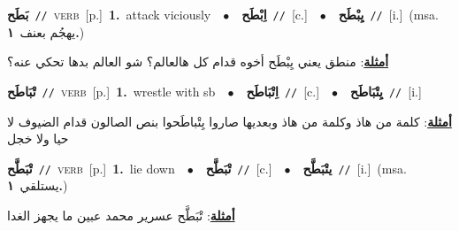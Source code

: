 \documentclass[10pt,a4paper,twoside]{article} %
\begin{document}
\begin{multicols}{2}
{\setlength\topsep{0pt}\textbf{\foreignlanguage{arabic}{بَطَح}}\ {\color{gray}\texttt{//}\color{black}}\ \textsc{verb}\ [p.]\ \textbf{1.}~attack viciously\ \ $\bullet$\ \ \setlength\topsep{0pt}\textbf{\foreignlanguage{arabic}{اِبْطَح}}\ {\color{gray}\texttt{//}\color{black}}\ [c.]\ \ $\bullet$\ \ \setlength\topsep{0pt}\textbf{\foreignlanguage{arabic}{يِبْطَح}}\ {\color{gray}\texttt{//}\color{black}}\ [i.]\ \color{gray}(msa. \foreignlanguage{arabic}{يهجُم بعنف}~\foreignlanguage{arabic}{\textbf{١.}})\color{black}\  \begin{flushright}\color{gray}\foreignlanguage{arabic}{\textbf{\underline{\foreignlanguage{arabic}{أمثلة}}}: منطق يعني يِبْطَح أخوه قدام كل هالعالم؟ شو العالم بدها تحكي عنه؟}\end{flushright}\color{black}} \vspace{2mm}

{\setlength\topsep{0pt}\textbf{\foreignlanguage{arabic}{تْبَاطَح}}\ {\color{gray}\texttt{//}\color{black}}\ \textsc{verb}\ [p.]\ \textbf{1.}~wrestle with sb\ \ $\bullet$\ \ \setlength\topsep{0pt}\textbf{\foreignlanguage{arabic}{اِتْبَاطَح}}\ {\color{gray}\texttt{//}\color{black}}\ [c.]\ \ $\bullet$\ \ \setlength\topsep{0pt}\textbf{\foreignlanguage{arabic}{يِتْبَاطَح}}\ {\color{gray}\texttt{//}\color{black}}\ [i.]\  \begin{flushright}\color{gray}\foreignlanguage{arabic}{\textbf{\underline{\foreignlanguage{arabic}{أمثلة}}}: كلمة من هاذ وكلمة من هاذ وبعديها صاروا يِتْباطَحوا بنص الصالون قدام الضيوف لا حيا ولا خجل}\end{flushright}\color{black}} \vspace{2mm}

{\setlength\topsep{0pt}\textbf{\foreignlanguage{arabic}{تْبَطَّح}}\ {\color{gray}\texttt{//}\color{black}}\ \textsc{verb}\ [p.]\ \textbf{1.}~lie down\ \ $\bullet$\ \ \setlength\topsep{0pt}\textbf{\foreignlanguage{arabic}{تْبَطَّح}}\ {\color{gray}\texttt{//}\color{black}}\ [c.]\ \ $\bullet$\ \ \setlength\topsep{0pt}\textbf{\foreignlanguage{arabic}{يتْبَطَّح}}\ {\color{gray}\texttt{//}\color{black}}\ [i.]\ \color{gray}(msa. \foreignlanguage{arabic}{يستلقي}~\foreignlanguage{arabic}{\textbf{١.}})\color{black}\  \begin{flushright}\color{gray}\foreignlanguage{arabic}{\textbf{\underline{\foreignlanguage{arabic}{أمثلة}}}: تْبَطَّح عسرير محمد  عبين ما يجهز الغدا}\end{flushright}\color{black}} \vspace{2mm}


\end{multicols}
\end{document}

